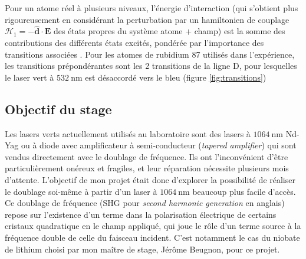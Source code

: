 \documentclass[11pt,a4paper] { article}
\newcommand{\lmbd}[1]{$\SI{#1}{\nano\metre}$}
\renewcommand{\v}[1]{\mathbf{#1}}
\begin{document}
Pour un atome réel à plusieurs niveaux, l'énergie d'interaction (qui s'obtient plus rigoureusement en considérant la perturbation par un hamiltonien de couplage $\mathcal H_1 = - \hat{\v d} \cdot \v E$ des états propres du système atome + champ) est la somme des contributions des différents états excités, pondérée par l'importance des transitions associées \citep{grimm}. Pour les atomes de rubidium 87 utilisés dans l'expérience, les transitions prépondérantes sont les 2 transitions de la ligne D, pour lesquelles le laser vert à $\SI{532}{\nano\metre}$ est désaccordé vers le bleu (figure \ref{fig:transitions})


\subsection{Objectif du stage}

Les lasers verts actuellement utilisés au laboratoire sont des lasers à \lmbd{1064} Nd-Yag ou à diode avec amplificateur à semi-conducteur (\textit{tapered amplifier}) qui sont vendus directement avec le doublage de fréquence. Ils ont l'inconvénient d'être particulièrement onéreux et fragiles, et leur réparation nécessite plusieurs mois d'attente. L'objectif de mon projet était donc d'explorer la possibilité de réaliser le doublage soi-même à partir d'un laser à \lmbd{1064} beaucoup plus facile d'accès. Ce doublage de fréquence (SHG pour \textit{second harmonic generation} en anglais) repose sur l'existence d'un terme dans la polarisation électrique de certains cristaux quadratique en le champ appliqué, qui joue le rôle d'un terme source à la fréquence double de celle du faisceau incident. C'est notamment le cas du niobate de lithium choisi par mon maître de stage, Jérôme Beugnon, pour ce projet. %
\end{document}
